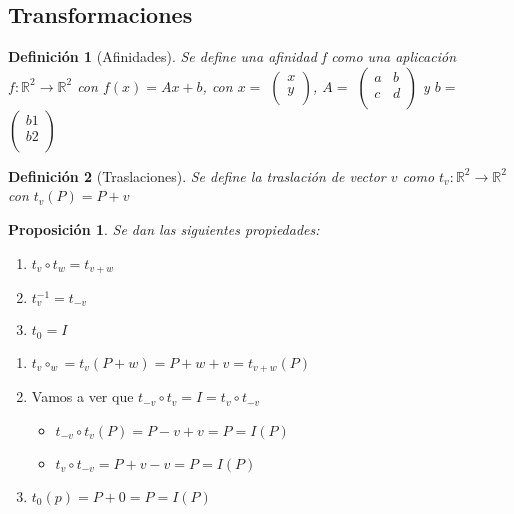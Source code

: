 \documentclass[11pt, a4paper]{article}
\makeatletter
\newif\IfInSansMode
\let\oldsf\sffamily
\renewcommand*{\sffamily}{\oldsf\mathversion{sans}\InSansModetrue}
\let\oldnorm\normalfont
\renewcommand*{\normalfont}{\oldnorm\InSansModefalse\mathversion{normal}}
\renewenvironment{proof}[1][\proofname] {\vspace{-15pt}\par\pushQED{\qed}\normalfont\topsep6\p@\@plus6\p@\relax\trivlist\item[\hskip\labelsep\it#1\@addpunct{.}]\ignorespaces}{\popQED\endtrivlist\@endpefalse}
\newcommand{\R}{\mathbb{R}}
\renewenvironment{proof}[1][\proofname] {\par\pushQED{\qed}\normalfont\topsep6\p@\@plus6\p@\relax\trivlist\item[\hskip\labelsep\itshape\sffamily#1\@addpunct{.}]\ignorespaces}{\popQED\endtrivlist\@endpefalse}
\theoremstyle{theorem-style}
\newtheorem{nprop}{Proposición}[section]
\theoremstyle{definition-style}
\newtheorem{ndef}{Definición}[section]
\theoremstyle{remark-style}
\theoremstyle{example-style}
\newenvironment{nlist}
{\begin{enumerate}
    \renewcommand\labelenumi{(\emph{\roman{enumi})}}}
  {\end{enumerate}}
\makeatother
\begin{document}
\subsection{Transformaciones}

\begin{ndef}[Afinidades]
  Se define una afinidad f como una aplicación $f:\R^2 \rightarrow \R^2$ con $f(x) = Ax + b$, con $x =$ $\begin{pmatrix}
    x\\
    y\\
  \end{pmatrix}$, $A =$ $\begin{pmatrix}
    a & b\\
    c & d\\
  \end{pmatrix}$
  y $b =$ $\begin{pmatrix}
    b1\\
    b2\\
  \end{pmatrix}$


\end{ndef}

\begin{ndef}[Traslaciones]
  Se define la traslación de vector $v$ como $t_v: \R^2 \rightarrow \R^2$ con $t_v(P) = P + v$
\end{ndef}


\begin{nprop}
  Se dan las siguientes propiedades:
  \begin{nlist}
  \item $t_v \circ t_w = t_{v+w}$
  \item $t_{v}^{-1} = t_{-v}$
  \item $t_0 = I$
  \end{nlist}
\end{nprop}
\begin{proof}\hfill \begin{center}\end{center}
  \begin{nlist}
  \item $t_v \circ_w = t_v(P+w) = P+w+v = t_{v+w}(P)$
  \item Vamos a ver que $t_{-v}\circ t_v = I = t_v \circ t_{-v}$
    \begin{itemize}
    \item $t_{-v}\circ t_v (P) = P-v+v = P = I(P)$
    \item $t_v\circ t_{-v} = P+v-v = P = I(P)$
    \end{itemize}
  \item $t_0(p) = P +0 = P = I(P)$
  \end{nlist}
\end{proof}
\end{document}
